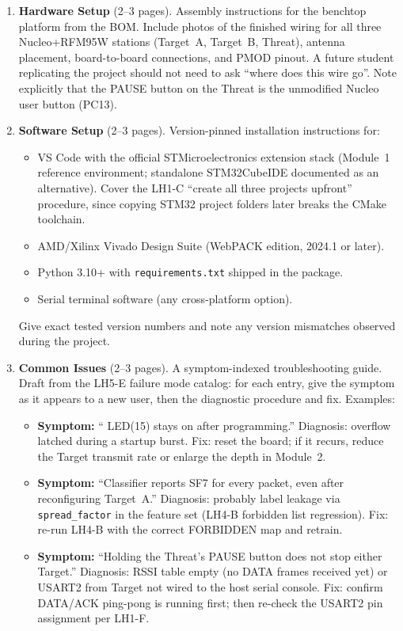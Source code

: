 \documentclass[11pt,letterpaper]{article}
\begin{document}
\begin{enumerate}[leftmargin=2em]
	\item \textbf{Hardware Setup} (2--3 pages). Assembly instructions for the benchtop platform from the \mbox{BOM}. Include photos of the finished wiring for all three Nucleo+RFM95W stations (Target~A, Target~B, Threat), antenna placement, board-to-board connections, and \mbox{PMOD} pinout. A future student replicating the project should not need to ask ``where does this wire go''. Note explicitly that the PAUSE button on the Threat is the unmodified Nucleo user button (PC13).
	\item \textbf{Software Setup} (2--3 pages). Version-pinned installation instructions for:
	\begin{itemize}[leftmargin=1.2em]
		\item VS Code with the official STMicroelectronics extension stack (Module~1 reference environment; standalone STM32CubeIDE documented as an alternative). Cover the LH1-C ``create all three projects upfront'' procedure, since copying STM32 project folders later breaks the CMake toolchain.
		\item AMD/Xilinx Vivado Design Suite (WebPACK edition, 2024.1 or later).
		\item Python 3.10+ with \texttt{requirements.txt} shipped in the package.
		\item Serial terminal software (any cross-platform option).
	\end{itemize}
	Give exact tested version numbers and note any version mismatches observed during the project.
	\item \textbf{Common Issues} (2--3 pages). A symptom-indexed troubleshooting guide. Draft from the LH5-E failure mode catalog: for each entry, give the symptom as it appears to a new user, then the diagnostic procedure and fix. Examples:
	\begin{itemize}[leftmargin=1.2em]
		\item \textbf{Symptom:} ``\FPGA{} \mbox{LED(15)} stays on after programming.'' Diagnosis: \FIFO{} overflow latched during a startup burst. Fix: reset the board; if it recurs, reduce the Target transmit rate or enlarge the \FIFO{} depth in Module~2.
		\item \textbf{Symptom:} ``Classifier reports SF7 for every packet, even after reconfiguring Target~A.'' Diagnosis: probably label leakage via \texttt{spread\_factor} in the feature set (LH4-B forbidden list regression). Fix: re-run LH4-B with the correct FORBIDDEN map and retrain.
		\item \textbf{Symptom:} ``Holding the Threat's PAUSE button does not stop either Target.'' Diagnosis: RSSI table empty (no DATA frames received yet) or USART2 from Target not wired to the host serial console. Fix: confirm DATA/ACK ping-pong is running first; then re-check the USART2 pin assignment per LH1-F.

\end{itemize}
\end{enumerate}
\end{document}
